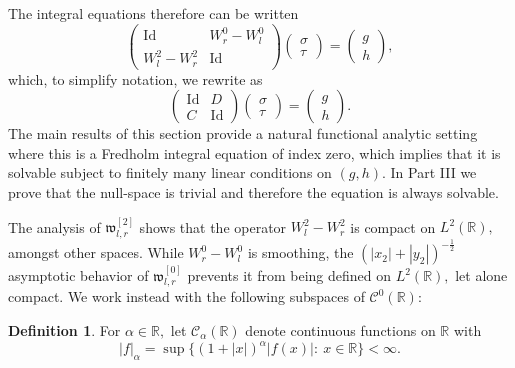 \documentclass[11pt]{article}
\newcommand\fw{\mathfrak w}
\newcommand\cC{\mathcal{C}}
\newcommand\bbR{\mathbb R}
\newcommand\Id{\operatorname{Id}}
\theoremstyle{definition}
\newtheorem{definition}{Definition}
\theoremstyle{remark}
\begin{document}
   The integral equations therefore can be written
   \begin{equation}\label{eqn141.34}
    \left(\begin{matrix}\Id &W^0_r-W^0_l\\W^2_l-W^2_r&\Id\end{matrix}\right)
              \left(\begin{matrix}\sigma\\\tau\end{matrix}\right)=
        \left(\begin{matrix}g\\h\end{matrix}\right),
   \end{equation}
   which, to simplify notation, we rewrite as
     \begin{equation}\label{eqn143.35}
     \left(\begin{matrix}\Id & D\\C&\Id\end{matrix}\right)
              \left(\begin{matrix}\sigma\\\tau\end{matrix}\right)=
        \left(\begin{matrix}g\\h\end{matrix}\right).
     \end{equation}
The main results of this section provide a natural functional analytic setting where
this is  a Fredholm integral equation of index zero, which implies that it is solvable
subject to finitely many linear conditions on $(g,h).$ In Part III we prove that
the null-space is trivial and therefore the equation is always solvable.

     
   The analysis of $\fw^{[2]}_{l,r}$ shows that the operator $W^2_l-W^2_r$
   is compact on $L^2(\bbR),$ amongst other spaces. While $W^0_r-W^0_l$ is
   smoothing, the  $(|x_2|+|y_2|)^{-\frac 12}$ asymptotic behavior of
   $\fw^{[0]}_{l,r}$ prevents it from being defined on $L^2(\bbR),$ let alone
   compact.   We work instead with  the following subspaces of $\cC^0(\bbR):$
   \begin{definition}
      For $\alpha\in\bbR,$  let $\cC_{\alpha}(\bbR)$ denote
      continuous functions on $\bbR$ with
   \begin{equation}
     |f|_{\alpha}=\sup\{(1+|x|)^{\alpha}|f(x)|:\:x\in\bbR\}<\infty.
   \end{equation}
   \end{definition}
   
\end{document}
